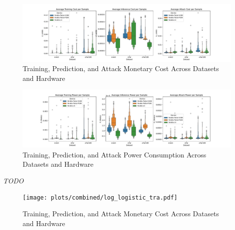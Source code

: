 \documentclass[conference]{IEEEtran}
\newcommand{\cm}[1]{\textit{{\color{blue}#1}}}
\begin{document}
\begin{figure}
    \centering
    \includegraphics[width=\textwidth]{plots/combined/cost.pdf}
    \caption{Training, Prediction, and Attack Monetary Cost Across Datasets and Hardware}
    \label{fig:cost}
\end{figure}

\begin{figure}
    \centering
    \includegraphics[width=\textwidth]{plots/combined/power.pdf}
    \caption{Training, Prediction, and Attack Power Consumption Across Datasets and Hardware}
    \label{fig:power}
\end{figure}

\cm{TODO}

\begin{figure}
    \centering
    \texttt{[image: plots/combined/log\_logistic\_tra.pdf]}
    \caption{Training, Prediction, and Attack Monetary Cost Across Datasets and Hardware}
    \label{fig:cost}
\end{figure}
\end{document}
